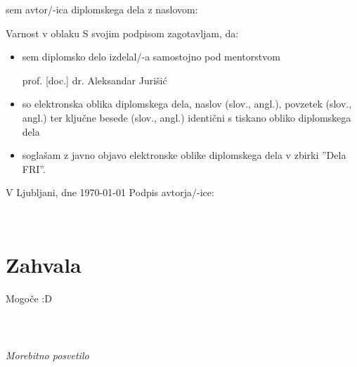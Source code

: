 \documentclass[12pt,a4paper,openany]{book}
\begin{document}
\vspace{1cm}
sem avtor/-ica diplomskega dela z naslovom:
   
\vspace{0.5cm}
Varnost v oblaku
\vspace{1.5cm}
S svojim podpisom zagotavljam, da:
\begin{itemize}
	\item sem diplomsko delo izdelal/-a samostojno pod mentorstvom 
	
	prof. [doc.] dr. Aleksandar Jurišić
	
	\item	so elektronska oblika diplomskega dela, naslov (slov., angl.), povzetek (slov., angl.) ter ključne besede (slov., 			angl.) identični s tiskano obliko diplomskega dela
	\item soglašam z javno objavo elektronske oblike diplomskega dela v zbirki ''Dela FRI''.
\end{itemize}

\vspace{1cm}
V Ljubljani, dne \today \hspace{1cm} Podpis avtorja/-ice:

\newpage 


\ \thispagestyle{empty}

\newpage



\chapter*{Zahvala}

\thispagestyle{empty}

Mogoče :D


\newpage


\ \thispagestyle{empty}

\newpage


\thispagestyle{empty}

$\;$ 

\vspace{5cm}
\hfill {\Large \em Morebitno posvetilo}
\thispagestyle{empty}
\end{document}
